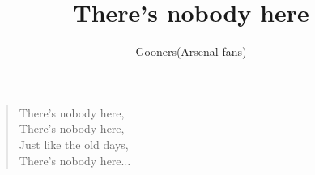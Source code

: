\documentclass[a4paper,12pt]{article}
\title{There's nobody here}
\author{Gooners(Arsenal fans)}
\date{}
\begin{document}
	
	\maketitle
	
	\begin{verse}
		
		There's nobody here, \\
		There's nobody here, \\
		Just like the old days, \\
		There's nobody here$\ldots$
		
	\end{verse}
	
\end{document}
